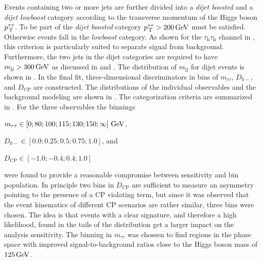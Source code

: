 Events containing two or more jets are further divided into a \textit{dijet boosted} and a \textit{dijet lowboost} category according to the
transverse momentum of the Higgs boson $p_\text{\,T}^{\tau\tau}$. 
To be part of the \textit{dijet boosted} category $p_\text{\,T}^{\tau\tau}>\text{200\,{GeV}}$ must be satisfied. Otherwise events fall in the \textit{lowboost} category.
As shown for the $\tau_\text{h}\tau_\text{h}$ channel in , this criterion is particularly suited to separate signal from background.
Furthermore, the two jets in the dijet categories are required to have $m_\text{jj}>\text{300\,{GeV}}$ as discussed in  and . The distribution of $m_\text{jj}$ for dijet events is shown in .
In the final fit, three-dimensional  discriminators in bins of $m_{\tau\tau}$, $D_{0-}$, and $D_\text{CP}$ are constructed. The distributions of the individual observables and the background modeling are shown in . The categorization criteria are summarized in . 
For the three observables the binnings
\begin{ct_version_list}
    \item $m_{\tau\tau} \in \left[ 0; 80;100;115;130;150;\infty \right]\text{\,{GeV}}$,
    \item $D_{0-} \in \left[ 0.0;0.25;0.5;0.75;1.0 \right]$, and
    \item $D_\text{CP} \in \left[ -1.0; -0.4;0.4;1.0 \right]$
\end{ct_version_list}%
were found to provide a reasonable compromise between sensitivity and bin population.
In principle two bins in $D_\text{CP}$ are sufficient to measure an asymmetry pointing to the presence of a CP violating term, but since it was observed that the event kinematics of different CP scenarios are rather similar, three bins were chosen.
The idea is that events with a clear signature, and therefore a high likelihood, found in the tails of the distribution get a larger impact on the analysis sensitivity.
The binning in $m_{\tau\tau}$ was chossen to find regions in the phase space with improved signal-to-background ratios close to the Higgs boson mass of $\text{125\,{GeV}}$.
